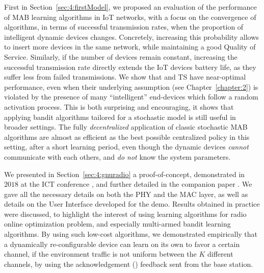 First in Section~\ref{sec:4:firstModel}, we proposed an evaluation of the performance of MAB learning algorithms in IoT networks,
with a focus on the convergence of algorithms, in terms of successful transmission rates, when the proportion of intelligent dynamic devices changes.
Concretely, increasing this probability allows to insert more devices in the same network, while maintaining a good Quality of Service.
Similarly, if the number of devices remain constant, increasing the successful transmission rate directly extends the IoT devices battery life, as they suffer less from failed transmissions.
We show that \UCB{} and TS have near-optimal performance, even when their underlying \iid{} assumption (see Chapter~\ref{chapter:2}) is violated by the presence of many ``intelligent'' end-devices which follow a random activation process.
%
This is both surprising and encouraging, it shows that applying bandit algorithms tailored for a stochastic model is still useful in broader settings.
The fully \emph{decentralized} application of classic stochastic MAB algorithms are almost as efficient as the best possible centralized policy in this setting, after a short learning period, even though the dynamic devices \emph{cannot} communicate with each others, and \emph{do not} know the system parameters.


We presented in Section~\ref{sec:4:gnuradio} a proof-of-concept, demonstrated in $2018$ at the ICT conference \cite{Besson2018ICT}, and further detailed in the companion paper \cite{Besson2019WCNC}.
We gave all the necessary details on both the PHY and the MAC layer, as well as details on the User Interface developed for the demo.
Results obtained in practice were discussed, to highlight the interest of using learning algorithms for radio online optimization problem, and especially multi-armed bandit learning algorithms.
%
By using such low-cost algorithms, we demonstrated empirically that a dynamically re-configurable device can learn on its own to favor a certain channel, if the environment traffic is not uniform between the $K$ different channels, by using the acknowledgement (\Ack) feedback sent from the base station.


